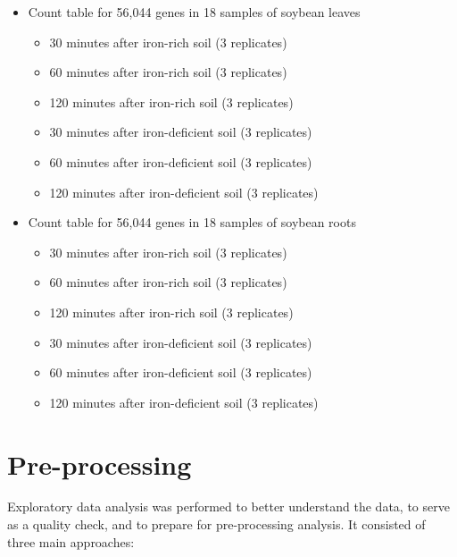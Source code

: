 \documentclass[11pt,a4paper,oldfontcommands,openany]{memoir}
\numberwithin{equation}{section} %
\begin{document}
\begin{itemize}
  \item Count table for 56,044 genes in 18 samples of soybean leaves
  \begin{itemize}
    \item 30 minutes after iron-rich soil (3 replicates)
    \item 60 minutes after iron-rich soil (3 replicates)
    \item 120 minutes after iron-rich soil (3 replicates)
    \item 30 minutes after iron-deficient soil (3 replicates)
    \item 60 minutes after iron-deficient soil (3 replicates)
    \item 120 minutes after iron-deficient soil (3 replicates)
  \end{itemize}
  \item Count table for 56,044 genes in 18 samples of soybean roots
    \begin{itemize}
    \item 30 minutes after iron-rich soil (3 replicates)
    \item 60 minutes after iron-rich soil (3 replicates)
    \item 120 minutes after iron-rich soil (3 replicates)
    \item 30 minutes after iron-deficient soil (3 replicates)
    \item 60 minutes after iron-deficient soil (3 replicates)
    \item 120 minutes after iron-deficient soil (3 replicates)
  \end{itemize}
\end{itemize}

\section{Pre-processing}

Exploratory data analysis was performed to better understand the data, to serve as a quality check, and to prepare for pre-processing analysis. It consisted of three main approaches:
\end{document}
